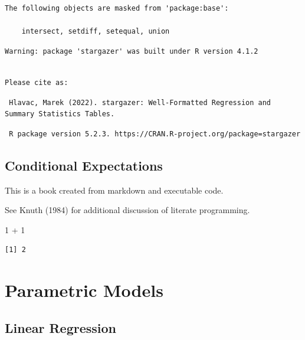 \documentclass[
  letterpaper,
  DIV=11,
  numbers=noendperiod]{scrreprt}
\newenvironment{Shaded}{\begin{snugshade}}{\end{snugshade}}
\newcommand{\DecValTok}[1]{\textcolor[rgb]{0.68,0.00,0.00}{#1}}
\newcommand{\SpecialCharTok}[1]{\textcolor[rgb]{0.37,0.37,0.37}{#1}}
\theoremstyle{definition}
\theoremstyle{remark}
\begin{document}
\begin{verbatim}
The following objects are masked from 'package:base':

    intersect, setdiff, setequal, union
\end{verbatim}

\begin{verbatim}
Warning: package 'stargazer' was built under R version 4.1.2
\end{verbatim}

\begin{verbatim}

Please cite as: 
\end{verbatim}

\begin{verbatim}
 Hlavac, Marek (2022). stargazer: Well-Formatted Regression and Summary Statistics Tables.
\end{verbatim}

\begin{verbatim}
 R package version 5.2.3. https://CRAN.R-project.org/package=stargazer 
\end{verbatim}


\hypertarget{conditional-expectations}{%
\chapter{Conditional Expectations}\label{conditional-expectations}}

This is a book created from markdown and executable code.

See Knuth (1984) for additional discussion of literate programming.

\begin{Shaded}
\begin{Highlighting}[]
\DecValTok{1} \SpecialCharTok{+} \DecValTok{1}
\end{Highlighting}
\end{Shaded}

\begin{verbatim}
[1] 2
\end{verbatim}

\part{Parametric Models}

\hypertarget{linear-regression}{%
\chapter{Linear Regression}\label{linear-regression}}
\end{document}
